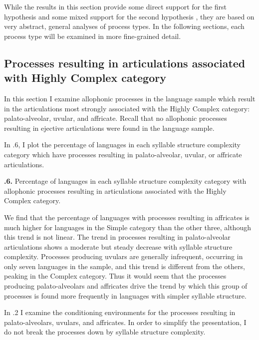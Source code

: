   While the results in this section provide some direct support for the first hypothesis  and some mixed support for the second hypothesis , they are based on very abstract, general analyses of process types. In the following sections, each process type will be examined in more fine-grained detail.

\subsection{Processes resulting in articulations associated with Highly Complex category}\label{sec:7.3.2}

  In this section I examine allophonic processes in the language sample which result in the articulations most strongly associated with the Highly Complex category: palato-alveolar, uvular, and affricate. Recall that no allophonic processes resulting in ejective articulations were found in the language sample.

  In .6, I plot the percentage of languages in each syllable structure complexity category which have processes resulting in palato-alveolar, uvular, or affricate articulations.

\textbf{.6.} Percentage of languages in each syllable structure complexity category with allophonic processes resulting in articulations associated with the Highly Complex category.

  We find that the percentage of languages with processes resulting in affricates is much higher for languages in the Simple category than the other three, although this trend is not linear. The trend in processes resulting in palato-alveolar articulations shows a moderate but steady decrease with syllable structure complexity. Processes producing uvulars are generally infrequent, occurring in only seven languages in the sample, and this trend is different from the others, peaking in the Complex category. Thus it would seem that the processes producing palato-alveolars and affricates drive the trend by which this group of processes is found more frequently in languages with simpler syllable structure.

  In .2 I examine the conditioning environments for the processes resulting in palato-alveolars, uvulars, and affricates. In order to simplify the presentation, I do not break the processes down by syllable structure complexity.

